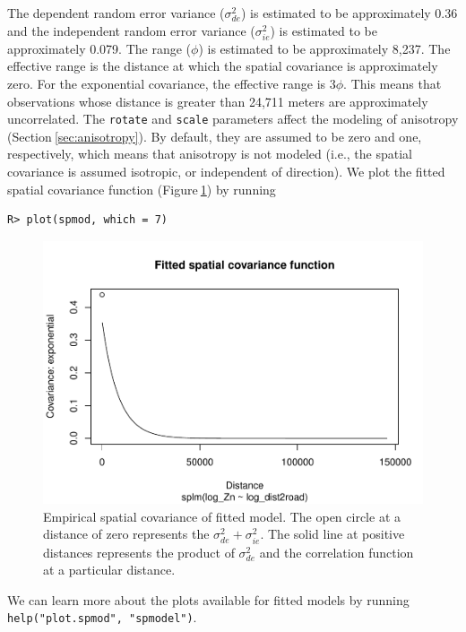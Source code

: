 \documentclass[10pt,letterpaper]{article}
\begin{document}
The dependent random error variance (\(\sigma^2_{de}\)) is estimated to
be approximately 0.36 and the independent random error variance
(\(\sigma^2_{ie}\)) is estimated to be approximately 0.079. The range
(\(\phi\)) is estimated to be approximately 8,237. The effective range
is the distance at which the spatial covariance is approximately zero.
For the exponential covariance, the effective range is \(3\phi\). This
means that observations whose distance is greater than 24,711 meters are
approximately uncorrelated. The \texttt{rotate} and \texttt{scale}
parameters affect the modeling of anisotropy
(Section\(~\)\ref{sec:anisotropy}). By default, they are assumed to be
zero and one, respectively, which means that anisotropy is not modeled
(i.e., the spatial covariance is assumed isotropic, or independent of
direction). We plot the fitted spatial covariance function
(Figure\(~\)\ref{fig:emp_spcov}) by running

\begin{verbatim}
R> plot(spmod, which = 7)
\end{verbatim}

\begin{figure}

{\centering \includegraphics[width=0.75\linewidth]{preprint_old_files/figure-latex/emp_spcov-1} 

}

\caption{Empirical spatial covariance of fitted model. The open circle at a distance of zero represents the $\sigma^2_{de} + \sigma^2_{ie}$. The solid line at positive distances represents the product of $\sigma^2_{de}$ and the correlation function at a particular distance.}\label{fig:emp_spcov}
\end{figure}

We can learn more about the plots available for fitted models by running
\texttt{help("plot.spmod",\ "spmodel")}.
\end{document}
